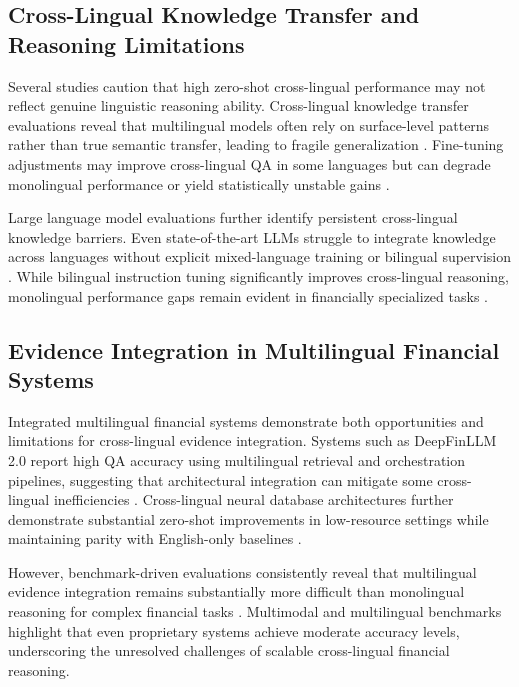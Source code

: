 \subsection{Cross-Lingual Knowledge Transfer and Reasoning Limitations}

Several studies caution that high zero-shot cross-lingual performance may not reflect genuine linguistic reasoning ability. Cross-lingual knowledge transfer evaluations reveal that multilingual models often rely on surface-level patterns rather than true semantic transfer, leading to fragile generalization \citep{rajaee2024transfer}. Fine-tuning adjustments may improve cross-lingual QA in some languages but can degrade monolingual performance or yield statistically unstable gains \citep{efimov2023adjustment}.

Large language model evaluations further identify persistent cross-lingual knowledge barriers. Even state-of-the-art LLMs struggle to integrate knowledge across languages without explicit mixed-language training or bilingual supervision \citep{chua2024barriers}. While bilingual instruction tuning significantly improves cross-lingual reasoning, monolingual performance gaps remain evident in financially specialized tasks \citep{hu2024nolanguage, zhang2024dolares}.

\subsection{Evidence Integration in Multilingual Financial Systems}

Integrated multilingual financial systems demonstrate both opportunities and limitations for cross-lingual evidence integration. Systems such as DeepFinLLM 2.0 report high QA accuracy using multilingual retrieval and orchestration pipelines, suggesting that architectural integration can mitigate some cross-lingual inefficiencies \citep{reddy2025deepfinllm}. Cross-lingual neural database architectures further demonstrate substantial zero-shot improvements in low-resource settings while maintaining parity with English-only baselines \citep{bacciu2025xndb}.

However, benchmark-driven evaluations consistently reveal that multilingual evidence integration remains substantially more difficult than monolingual reasoning for complex financial tasks \citep{peng2025multifinben, xue2024famma}. Multimodal and multilingual benchmarks highlight that even proprietary systems achieve moderate accuracy levels, underscoring the unresolved challenges of scalable cross-lingual financial reasoning.

